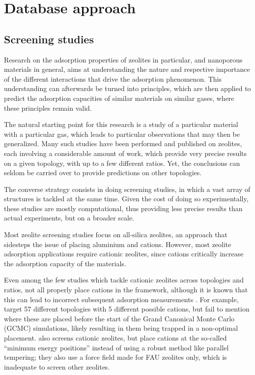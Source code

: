 \documentclass[main.tex]{subfiles}
\begin{document}
\chapter{Database approach}\label{database}
\clearpage

\section{Screening studies}

Research on the adsorption properties of zeolites in particular, and nanoporous materials in general, aims at understanding the nature and respective importance of the different interactions that drive the adsorption phenomenon. This understanding can afterwards be turned into principles, which are then applied to predict the adsorption capacities of similar materials on similar gases, where these principles remain valid.

The natural starting point for this research is a study of a particular material with a particular gas, which leads to particular observations that may then be generalized. Many such studies have been performed and published on zeolites, each involving a considerable amount of work, which provide very precise results on a given topology, with up to a few different \SiAl ratios. Yet, the conclusions can seldom be carried over to provide predictions on other topologies.

The converse strategy consists in doing screening studies, in which a vast array of structures is tackled at the same time. Given the cost of doing so experimentally, these studies are mostly computational, thus providing less precise results than actual experiments, but on a broader scale.

Most zeolite screening studies focus on all-silica zeolites, an approach that sidesteps the issue of placing aluminium and cations. However, most zeolite adsorption applications require cationic zeolites, since cations critically increase the adsorption capacity of the materials.

Even among the few studies which tackle cationic zeolites across topologies and \SiAl ratios, not all properly place cations in the framework, although it is known that this can lead to incorrect subsequent adsorption measurements \autocite{Fang2016}. For example, \textcite{Mousavi2023} target 57 different topologies with 5 different possible cations, but fail to mention where these are placed before the start of the Grand Canonical Monte Carlo (GCMC) simulations, likely resulting in them being trapped in a non-optimal placement. \Textcite{SmitNature2012} also screens cationic zeolites, but place cations at the so-called ``minimum energy positions'' instead of using a robust method like parallel tempering; they also use a force field made for FAU zeolites only, which is inadequate to screen other zeolites.
\end{document}
